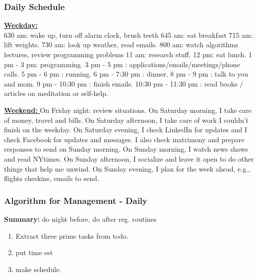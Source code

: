 \begin{frame} 
\frametitle{Daily Schedule} 

\textbf{\underline{Weekday: }} \\
630 am: wake up, turn off alarm clock, brush teeth
645 am: eat breakfast
715 am: lift weights. 
730 am: look up weather, read emails. 
800 am: watch algorithms lectures, review programming problems 
11 am: research stuff. 
12 pm: eat lunch.
1 pm - 3 pm: programming. 
3 pm - 5 pm : applications/emails/meetings/phone calls. 
5 pm  - 6 pm : running.
6 pm  - 7:30 pm : dinner.
8 pm - 9 pm : talk to you and mom.
9 pm - 10:30 pm : finish emails.
10:30 pm - 11:30 pm : read books / articles on meditation or
self-help.


\underline{\textbf{Weekend: }} 
On Friday night: review situations. 
On Saturday morning, I take care of money, travel and bills. 
On Saturday afternoon, I take care of work I couldn't finish on the
weekday. 
On Saturday evening, I check LinkedIn for updates and I check Facebook
for updates and messages. I also check matrimony and prepare responses
to send on Sunday morning.
On Sunday morning, I watch news shows and read NYtimes. On Sunday
afternoon, I socialize and leave it open to do other things that help
me unwind. On Sunday evening, I plan for the week ahead, e.g., flights
checkins, emails to send. 

\end{frame} 

\begin{frame} [label=alg-daily]
\frametitle{Algorithm for Management - Daily} 
{\small \textbf{Summary:}  do night before, do after reg. routines} \\ 
\begin{enumerate} 
\tiny \item \tiny Extract three prime tasks from todo. 
\item \tiny put time est
\item \tiny make schedule. 
\end{enumerate} 
\end{frame} 

